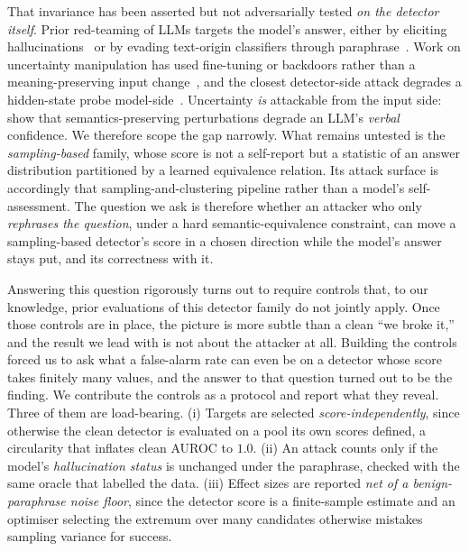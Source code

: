 That invariance has been asserted but not adversarially tested \emph{on the detector
itself}. Prior red-teaming of LLMs targets the model's answer, either by eliciting
hallucinations~\citep{liang2025seca, liang2026realista} or by evading text-origin
classifiers through paraphrase~\citep{cheng2025advparaphrasing, fang2025copa}. Work on
uncertainty manipulation has used fine-tuning or backdoors rather than a
meaning-preserving input change~\citep{uncertaintyfragile2024}, and the closest
detector-side attack degrades a hidden-state probe model-side~\citep{corvus2026}.
Uncertainty \emph{is} attackable from the input side: \citet{obadinma2025verbal} show that
semantics-preserving perturbations degrade an LLM's \emph{verbal} confidence. We therefore
scope the gap narrowly. What remains untested is the \emph{sampling-based} family, whose
score is not a self-report but a statistic of an answer distribution partitioned by a
learned equivalence relation. Its attack surface is accordingly that sampling-and-clustering
pipeline rather than a model's self-assessment. The question we ask is therefore whether an
attacker who only \emph{rephrases the question}, under a hard semantic-equivalence
constraint, can move a sampling-based detector's score in a chosen direction while the
model's answer stays put, and its correctness with it.

Answering this question rigorously turns out to require controls that, to our knowledge,
prior evaluations of this detector family do not jointly apply. Once those controls are in
place, the picture is more subtle than a clean ``we broke it,'' and the result we lead with
is not about the attacker at all. Building the controls forced us to ask what a false-alarm
rate can even be on a detector whose score takes finitely many values, and the answer to that
question turned out to be the finding. We contribute the controls
as a protocol and report what they reveal. Three of them are load-bearing. (i) Targets are
selected \emph{score-independently}, since otherwise the clean detector is evaluated on a
pool its own scores defined, a circularity that inflates clean AUROC to $1.0$. (ii) An
attack counts only if the model's \emph{hallucination status} is unchanged under the
paraphrase, checked with the same oracle that labelled the data. (iii) Effect sizes are
reported \emph{net of a benign-paraphrase noise floor}, since the detector score is a
finite-sample estimate and an optimiser selecting the extremum over many candidates
otherwise mistakes sampling variance for success.

